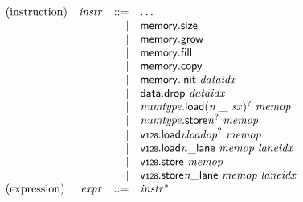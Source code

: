 $$
\begin{array}{@{}lrrl@{}l@{}}
\mbox{(instruction)} & {\mathit{instr}} &::=& \dots \\ &&|&
\mathsf{memory.size} \\ &&|&
\mathsf{memory.grow} \\ &&|&
\mathsf{memory.fill} \\ &&|&
\mathsf{memory.copy} \\ &&|&
\mathsf{memory.init}~{\mathit{dataidx}} \\ &&|&
\mathsf{data.drop}~{\mathit{dataidx}} \\ &&|&
{{\mathit{numtype}}.\mathsf{load}}{{({\mathit{n}}~\mathsf{\_}~{\mathit{sx}})^?}}~{\mathit{memop}} \\ &&|&
{{\mathit{numtype}}.\mathsf{store}}{{{\mathit{n}}^?}}~{\mathit{memop}} \\ &&|&
{\mathsf{v{\scriptstyle128}.load}}{{{\mathit{vloadop}}^?}}~{\mathit{memop}} \\ &&|&
{{{\mathsf{v{\scriptstyle128}.load}}{{\mathit{n}}}}{\mathsf{\_}}}{\mathsf{lane}}~{\mathit{memop}}~{\mathit{laneidx}} \\ &&|&
\mathsf{v{\scriptstyle128}.store}~{\mathit{memop}} \\ &&|&
{{{\mathsf{v{\scriptstyle128}.store}}{{\mathit{n}}}}{\mathsf{\_}}}{\mathsf{lane}}~{\mathit{memop}}~{\mathit{laneidx}} \\
\mbox{(expression)} & {\mathit{expr}} &::=& {{\mathit{instr}}^\ast} \\
\end{array}
$$

\vspace{1ex}

